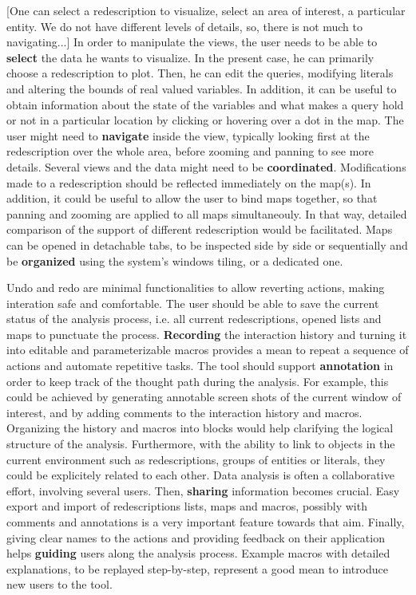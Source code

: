 [One can select a redescription to visualize, select an area of interest, a particular entity.
We do not have different levels of details, so, there is not much to navigating...]
In order to manipulate the views, the user needs to be able to
\textbf{select} the data he wants to visualize. In the present case,
he can primarily choose a redescription to plot. Then, he can edit the
queries, modifying literals and altering the bounds of real valued
variables. In addition, it can be useful to obtain information about
the state of the variables and what makes a query hold or not in a
particular location by clicking or hovering over a dot in the map.
The user might need to \textbf{navigate} inside the view, typically
looking first at the redescription over the whole area, before zooming
and panning to see more details. Several views and the data might need
to be \textbf{coordinated}.  Modifications made to a redescription
should be reflected immediately on the map(s). In addition, it could
be useful to allow the user to bind maps together, so that panning and
zooming are applied to all maps simultaneouly. In that way, detailed
comparison of the support of different redescription would be
facilitated.  Maps can be opened in detachable tabs, to be inspected
side by side or sequentially and be \textbf{organized} using the
system's windows tiling, or a dedicated one.

Undo and redo are minimal functionalities to allow reverting actions,
making interation safe and comfortable.  The user should be able to
save the current status of the analysis process, i.e. all current
redescriptions, opened lists and maps to punctuate the
process. \textbf{Recording} the interaction history and turning it
into editable and parameterizable macros provides a mean to repeat a
sequence of actions and automate repetitive tasks.  The tool should
support \textbf{annotation} in order to keep track of the thought path
during the analysis.  For example, this could be achieved by
generating annotable screen shots of the current window of interest,
and by adding comments to the interaction history and macros.
Organizing the history and macros into blocks would help clarifying
the logical structure of the analysis.  Furthermore, with the ability
to link to objects in the current environment such as redescriptions,
groups of entities or literals, they could be explicitely related to
each other.  Data analysis is often a collaborative effort, involving
several users. Then, \textbf{sharing} information becomes crucial.
Easy export and import of redescriptions lists, maps and macros,
possibly with comments and annotations is a very important feature
towards that aim.  Finally, giving clear names to the actions and
providing feedback on their application helps \textbf{guiding} users
along the analysis process. Example macros with detailed explanations,
to be replayed step-by-step, represent a good mean to introduce new
users to the tool.

